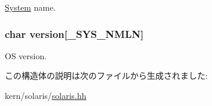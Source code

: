 \hyperlink{classSystem}{System} name. \hypertarget{structSolaris_1_1utsname_a1e88526d3e96aa25d88df1541dafe922}{
\subsubsection[{version}]{\setlength{\rightskip}{0pt plus 5cm}char {\bf version}\mbox{[}{\bf \_\-SYS\_\-NMLN}\mbox{]}}}
\label{structSolaris_1_1utsname_a1e88526d3e96aa25d88df1541dafe922}


OS version. 

この構造体の説明は次のファイルから生成されました:\begin{DoxyCompactItemize}
\item 
kern/solaris/\hyperlink{kern_2solaris_2solaris_8hh}{solaris.hh}\end{DoxyCompactItemize}
